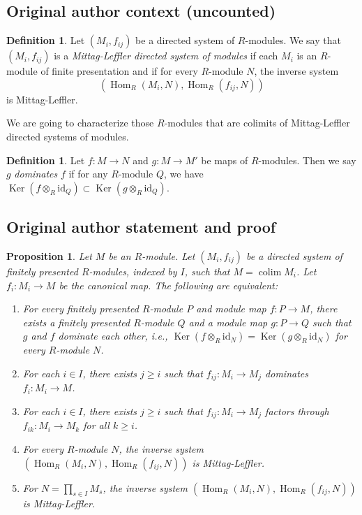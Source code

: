 \documentclass[10pt,a4paper]{amsart}
\theoremstyle{plain}
\newtheorem{proposition}[subsection]{Proposition}
\theoremstyle{definition}
\newtheorem{definition}[subsection]{Definition}
\theoremstyle{remark}
\numberwithin{equation}{subsection}
\def\colim{\mathop{\mathrm{colim}}\nolimits}
\def\Hom{\mathop{\mathrm{Hom}}\nolimits}
\def\Ker{\mathop{\mathrm{Ker}}}
\begin{document}
\subsection*{Original author context (uncounted)}
\begin{definition}
\label{context-definition-ML-inductive-system}
Let $(M_i, f_{ij})$ be a directed system of $R$-modules.  We say that
$(M_i, f_{ij})$ is a {\it Mittag-Leffler directed system of modules} if each
$M_i$ is an $R$-module of finite presentation and if for every $R$-module $N$,
the inverse system
$$
(\Hom_R(M_i, N), \Hom_R(f_{ij}, N))
$$
is Mittag-Leffler.
\end{definition}

\noindent
We are going to characterize those $R$-modules that are colimits of
Mittag-Leffler directed systems of modules.

\begin{definition}
\label{context-definition-domination}
Let $f: M \to N$ and $g: M \to M'$ be maps of $R$-modules.
Then we say $g$ {\it dominates} $f$ if for any $R$-module $Q$, we have $\Ker(f
\otimes_R \text{id}_Q) \subset \Ker(g \otimes_R \text{id}_Q)$.
\end{definition}

\subsection*{Original author statement and proof}
\begin{proposition}
\label{proposition-ML-characterization}
Let $M$ be an $R$-module.  Let $(M_i, f_{ij})$ be a directed system of finitely
presented $R$-modules, indexed by $I$, such that $M = \colim M_i$.  Let
$f_i:
M_i \to M$ be the canonical map.  The following are equivalent:
\begin{enumerate}
\item For every finitely presented $R$-module $P$ and module map $f: P
\to M$, there exists a finitely presented $R$-module $Q$ and a module
map $g: P \to Q$ such that $g$ and $f$ dominate each other, i.e.,
$\Ker(f \otimes_R \text{id}_N) = \Ker(g \otimes_R \text{id}_N)$
for every $R$-module $N$.
\item For each $i \in I$, there exists $j \geq i$ such that $f_{ij}: M_i
\to M_j$ dominates $f_i: M_i \to M$.
\item For each $i \in I$, there exists $j \geq i$ such that $f_{ij}: M_i
\to M_j$ factors through $f_{ik}: M_i \to M_k$ for all $k \geq
i$.
\item For every $R$-module $N$, the inverse system
$(\Hom_R(M_i, N), \Hom_R(f_{ij}, N))$ is Mittag-Leffler.
\item For $N = \prod_{s \in I} M_s$, the inverse system
$(\Hom_R(M_i, N), \Hom_R(f_{ij}, N))$ is Mittag-Leffler.
\end{enumerate}
\end{proposition}
\end{document}
